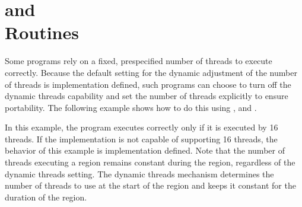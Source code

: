 \pagebreak
\section{ and \\
 Routines}
\label{sec:set_dynamic_nthrs}

Some programs rely on a fixed, prespecified number of threads to execute correctly. 
Because the default setting for the dynamic adjustment of the number of threads 
is implementation defined, such programs can choose to turn off the dynamic threads 
capability and set the number of threads explicitly to ensure portability. The 
following example shows how to do this using , and .

In this example, the program executes correctly only if it is executed by 16 threads. 
If the implementation is not capable of supporting 16 threads, the behavior of 
this example is implementation defined. Note that the number of threads executing 
a  region remains constant during the region, regardless of the 
dynamic threads setting. The dynamic threads mechanism determines the number of 
threads to use at the start of the  region and keeps it constant 
for the duration of the region.




